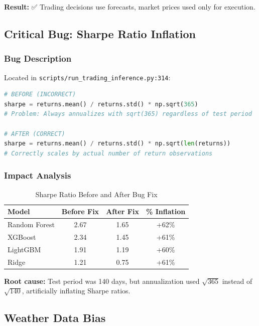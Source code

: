 \documentclass[11pt,a4paper]{article}
\begin{document}
\textbf{Result:} ✅ Trading decisions use forecasts, market prices used only for execution.

\subsection{Critical Bug: Sharpe Ratio Inflation}

\subsubsection{Bug Description}

Located in \texttt{scripts/run\_trading\_inference.py:314}:

\begin{lstlisting}[language=Python]
# BEFORE (INCORRECT)
sharpe = returns.mean() / returns.std() * np.sqrt(365)
# Problem: Always annualizes with sqrt(365) regardless of test period

# AFTER (CORRECT)
sharpe = returns.mean() / returns.std() * np.sqrt(len(returns))
# Correctly scales by actual number of return observations
\end{lstlisting}

\subsubsection{Impact Analysis}

\begin{table}[H]
\centering
\begin{tabular}{lccc}
\toprule
\textbf{Model} & \textbf{Before Fix} & \textbf{After Fix} & \textbf{\% Inflation} \\
\midrule
Random Forest & 2.67 & 1.65 & +62\% \\
XGBoost & 2.34 & 1.45 & +61\% \\
LightGBM & 1.91 & 1.19 & +60\% \\
Ridge & 1.21 & 0.75 & +61\% \\
\bottomrule
\end{tabular}
\caption{Sharpe Ratio Before and After Bug Fix}
\end{table}

\textbf{Root cause:} Test period was 140 days, but annualization used $\sqrt{365}$ instead of $\sqrt{140}$, artificially inflating Sharpe ratios.

\subsection{Weather Data Bias}
\end{document}
